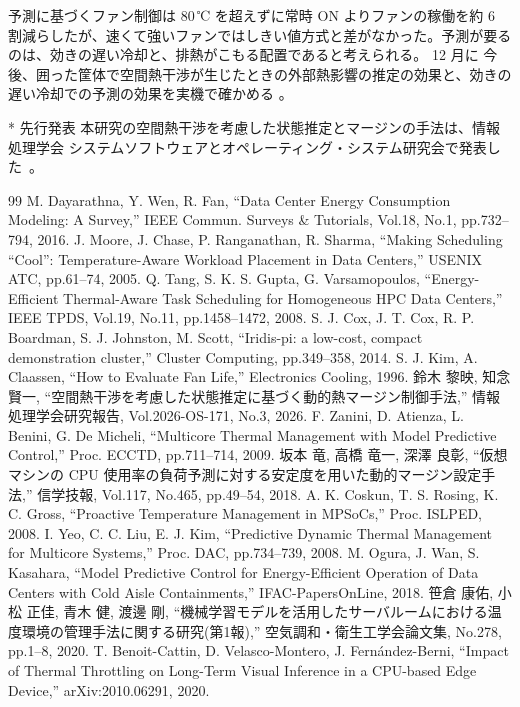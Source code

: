 \documentclass[10pt,uplatex,dvipdfmx,twocolumn]{jsarticle}
\makeatletter
\renewcommand{\section}{\@startsection{section}{1}{\z@}{0.6\Cvs \@plus.3\Cdp}{0.3\Cvs}{\normalfont\large\headfont\raggedright}}
\providecommand{\DIFadd}[1]{{\protect\color{blue} \sf #1}} %
\providecommand{\DIFdel}[1]{{\protect\color{red} \scriptsize #1}} %
\providecommand{\DIFaddbegin}{} %
\providecommand{\DIFaddend}{} %
\providecommand{\DIFdelbegin}{} %
\providecommand{\DIFdelend}{} %
\newcommand{\DIFscaledelfig}{0.5}
\newlength{\DIFdelgraphicswidth} %
\newlength{\DIFdelgraphicsheight} %
\newcommand{\DIFaddincludegraphics}[2][]{{\color{blue}\fbox{\DIFOincludegraphics[#1]{#2}}}} %
\newcommand{\DIFdelincludegraphics}[2][]{%
\sbox{\DIFdelgraphicsbox}{\DIFOincludegraphics[#1]{#2}}%
\settoboxwidth{\DIFdelgraphicswidth}{\DIFdelgraphicsbox} %
\settoboxtotalheight{\DIFdelgraphicsheight}{\DIFdelgraphicsbox} %
\scalebox{\DIFscaledelfig}{%
\parbox[b]{\DIFdelgraphicswidth}{\usebox{\DIFdelgraphicsbox}\\[-\baselineskip] \rule{\DIFdelgraphicswidth}{0em}}\llap{\resizebox{\DIFdelgraphicswidth}{\DIFdelgraphicsheight}{%
\setlength{\unitlength}{\DIFdelgraphicswidth}%
\begin{picture}(1,1)%
\thicklines\linethickness{2pt} %
{\color[rgb]{1,0,0}\put(0,0){\framebox(1,1){}}}%
{\color[rgb]{1,0,0}\put(0,0){\line( 1,1){1}}}%
{\color[rgb]{1,0,0}\put(0,1){\line(1,-1){1}}}%
\end{picture}%
}\hspace*{3pt}}} %
} %
\DeclareRobustCommand{\DIFaddbegin}{\DIFOaddbegin \let\includegraphics\DIFaddincludegraphics} %
\DeclareRobustCommand{\DIFaddend}{\DIFOaddend \let\includegraphics\DIFOincludegraphics} %
\DeclareRobustCommand{\DIFdelbegin}{\DIFOdelbegin \let\includegraphics\DIFdelincludegraphics} %
\DeclareRobustCommand{\DIFdelend}{\DIFOaddend \let\includegraphics\DIFOincludegraphics} %
\makeatother
\begin{document}
\section{おわりに}
予測に基づくファン制御は 80\,℃ を超えずに常時 ON よりファンの稼働を約 6 割減らしたが、速くて強いファンではしきい値方式と差がなかった。予測が要るのは、効きの遅い冷却と、排熱がこもる配置であると考えられる。\DIFdelbegin \DIFdel{12 月に}\DIFdelend \DIFaddbegin \DIFadd{今後}\DIFaddend 、囲った筐体で空間熱干渉が生じたときの外部熱影響の推定の効果と、効きの遅い冷却での予測の効果を実機で確かめる\DIFaddbegin \DIFadd{。
}

\section*{\DIFadd{先行発表}}
\DIFadd{本研究の空間熱干渉を考慮した状態推定とマージンの手法は、情報処理学会 システムソフトウェアとオペレーティング・システム研究会で発表した~\cite{ipsj}}\DIFaddend 。

\footnotesize{
\begin{thebibliography}{99}
  \setlength{\itemsep}{0pt}
   M. Dayarathna, Y. Wen, R. Fan, ``Data Center Energy Consumption Modeling: A Survey,'' IEEE Commun. Surveys \& Tutorials, Vol.18, No.1, pp.732--794, 2016.
   J. Moore, J. Chase, P. Ranganathan, R. Sharma, ``Making Scheduling ``Cool'': Temperature-Aware Workload Placement in Data Centers,'' USENIX ATC, pp.61--74, 2005.
   Q. Tang, S. K. S. Gupta, G. Varsamopoulos, ``Energy-Efficient Thermal-Aware Task Scheduling for Homogeneous HPC Data Centers,'' IEEE TPDS, Vol.19, No.11, pp.1458--1472, 2008.
   S. J. Cox, J. T. Cox, R. P. Boardman, S. J. Johnston, M. Scott, ``Iridis-pi: a low-cost, compact demonstration cluster,'' Cluster Computing, pp.349--358, 2014.
   S. J. Kim, A. Claassen, ``How to Evaluate Fan Life,'' Electronics Cooling, 1996.
   鈴木 黎映, 知念 賢一, ``空間熱干渉を考慮した状態推定に基づく動的熱マージン制御手法,'' 情報処理学会研究報告, Vol.2026-OS-171, No.3, 2026.
   F. Zanini, D. Atienza, L. Benini, G. De Micheli, ``Multicore Thermal Management with Model Predictive Control,'' Proc. ECCTD, pp.711--714, 2009.
   坂本 竜, 高橋 竜一, 深澤 良彰, ``仮想マシンの CPU 使用率の負荷予測に対する安定度を用いた動的マージン設定手法,'' 信学技報, Vol.117, No.465, pp.49--54, 2018.
   A. K. Coskun, T. S. Rosing, K. C. Gross, ``Proactive Temperature Management in MPSoCs,'' Proc. ISLPED, 2008.
   I. Yeo, C. C. Liu, E. J. Kim, ``Predictive Dynamic Thermal Management for Multicore Systems,'' Proc. DAC, pp.734--739, 2008.
   M. Ogura, J. Wan, S. Kasahara, ``Model Predictive Control for Energy-Efficient Operation of Data Centers with Cold Aisle Containments,'' IFAC-PapersOnLine, 2018.
   笹倉 康佑, 小松 正佳, 青木 健, 渡邊 剛, ``機械学習モデルを活用したサーバルームにおける温度環境の管理手法に関する研究(第1報),'' 空気調和・衛生工学会論文集, No.278, pp.1--8, 2020.
   T. Benoit-Cattin, D. Velasco-Montero, J. Fern\'{a}ndez-Berni, ``Impact of Thermal Throttling on Long-Term Visual Inference in a CPU-based Edge Device,'' arXiv:2010.06291, 2020.
\end{thebibliography}
}
\end{document}
